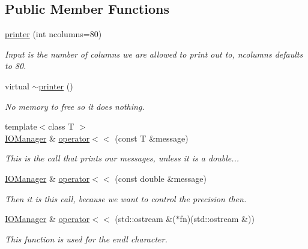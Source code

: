 \subsection*{Public Member Functions}
\begin{DoxyCompactItemize}
\item 
\hyperlink{classJKBuilder_1_1printer_af4e2cc2ab8b108895389d46fa14d4a13}{printer} (int ncolumns=80)
\begin{DoxyCompactList}\small\item\em Input is the number of columns we are allowed to print out to, ncolumns defaults to 80. \item\end{DoxyCompactList}\item 
virtual \hyperlink{classJKBuilder_1_1printer_a555702a98f98cda2ba39f19c0c9397c6}{$\sim$printer} ()
\begin{DoxyCompactList}\small\item\em No memory to free so it does nothing. \item\end{DoxyCompactList}\item 
{\footnotesize template$<$class T $>$ }\\\hyperlink{classJKBuilder_1_1IOManager}{IOManager} \& \hyperlink{classJKBuilder_1_1IOManager_a505a35212a21e4884ed24b021c0add4b}{operator$<$$<$} (const T \&message)
\begin{DoxyCompactList}\small\item\em This is the call that prints our messages, unless it is a double... \item\end{DoxyCompactList}\item 
\hyperlink{classJKBuilder_1_1IOManager}{IOManager} \& \hyperlink{classJKBuilder_1_1IOManager_a127779d1803b6ffe9e44a3a36e46910e}{operator$<$$<$} (const double \&message)
\begin{DoxyCompactList}\small\item\em Then it is this call, because we want to control the precision then. \item\end{DoxyCompactList}\item 
\hyperlink{classJKBuilder_1_1IOManager}{IOManager} \& \hyperlink{classJKBuilder_1_1IOManager_a4ab394f377d37c6598659317320ec38c}{operator$<$$<$} (std::ostream \&($\ast$fn)(std::ostream \&))
\begin{DoxyCompactList}\small\item\em This function is used for the endl character. \item\end{DoxyCompactList}\end{DoxyCompactItemize}
